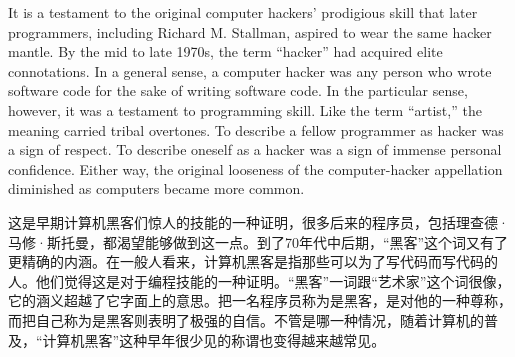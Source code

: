 
\ifdefined\eng
It is a testament to the original computer hackers' prodigious skill that later programmers, including Richard M. Stallman, aspired to wear the same hacker mantle. By the mid to late 1970s, the term ``hacker'' had acquired elite connotations. In a general sense, a computer hacker was any person who wrote software code for the sake of writing software code. In the particular sense, however, it was a testament to programming skill. Like the term ``artist,'' the meaning carried tribal overtones. To describe a fellow programmer as hacker was a sign of respect. To describe oneself as a hacker was a sign of immense personal confidence. Either way, the original looseness of the computer-hacker appellation diminished as computers became more common.
\fi

\ifdefined\chs
这是早期计算机黑客们惊人的技能的一种证明，很多后来的程序员，包括理查德·马修·斯托曼，都渴望能够做到这一点。到了70年代中后期，“黑客”这个词又有了更精确的内涵。在一般人看来，计算机黑客是指那些可以为了写代码而写代码的人。他们觉得这是对于编程技能的一种证明。“黑客”一词跟“艺术家”这个词很像，它的涵义超越了它字面上的意思。把一名程序员称为是黑客，是对他的一种尊称，而把自己称为是黑客则表明了极强的自信。不管是哪一种情况，随着计算机的普及，“计算机黑客”这种早年很少见的称谓也变得越来越常见。
\fi

